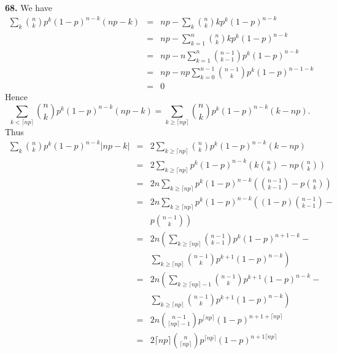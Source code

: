 \documentclass[a4paper,12pt]{article}
\newcommand{\newpar}[1]{\bigskip \noindent \textbf{#1.}}
\begin{document}
\newpar{68} We have
\begin{eqnarray*}
  \sum_k {n \choose k} p^k(1-p)^{n-k}(np-k) &=& np - \sum_k {n \choose
    k}k p^k(1-p)^{n-k} \\
  &=& np - \sum_{k=1}^n {n\choose k}kp^k(1-p)^{n-k} \\
  &=& np - n \sum_{k=1}^n {n-1\choose k-1}p^k(1-p)^{n-k} \\
  &=& np - np \sum_{k=0}^{n-1} {n-1\choose k}p^k(1-p)^{n-1-k} \\
  &=& 0
\end{eqnarray*}
Hence
\[ \sum_{k < \lceil np\rceil} {n \choose k} p^k(1-p)^{n-k}(np-k) =
\sum_{k \ge \lceil np\rceil} {n \choose k} p^k (1-p)^{n-k}(k-np).\]
Thus
\begin{eqnarray*}
  \sum_k {n \choose k} p^k(1-p)^{n-k}|np-k| &=& 2 \sum_{k \ge \lceil
    np\rceil} {n \choose k} p^k(1-p)^{n-k}(k-np) \\
  &=& 2 \sum_{k \ge \lceil np\rceil} p^k(1-p)^{n-k}\left( k{n \choose
    k} - np {n \choose k} \right) \\
  &=& 2n \sum_{k \ge \lceil np\rceil} p^k(1-p)^{n-k}\left( {n-1 \choose
    k-1} - p {n \choose k} \right) \\
  &=& 2n \sum_{k \ge \lceil np\rceil} p^k(1-p)^{n-k}\left( (1-p){n-1 \choose
    k-1} -\right.\\
  && \left. p {n-1 \choose k} \right) \\
  &=& 2n \left( \sum_{k \ge \lceil np\rceil}{n-1\choose
    k-1}p^k(1-p)^{n+1-k}\right. - \\
  && \left. \sum_{k \ge \lceil np\rceil} {n-1\choose k}
  p^{k+1}(1-p)^{n-k}\right) \\
  &=& 2n \left( \sum_{k \ge \lceil np\rceil -1} {n-1 \choose k}
  p^{k+1}(1-p)^{n-k} \right.-\\
  && \left.\sum_{k \ge \lceil np\rceil} {n-1 \choose k}
  p^{k+1}(1-p)^{n-k}\right) \\
  &=& 2n {n-1 \choose \lceil np\rceil -1} p^{\lceil np\rceil} (1-p)^{n
    +1 +\lceil np\rceil} \\
  &=& 2\lceil np\rceil {n \choose \lceil np\rceil} p^{\lceil np\rceil}
  (1-p)^{n+1 \lceil np\rceil}
\end{eqnarray*}
\end{document}
